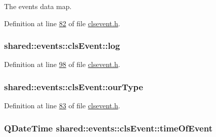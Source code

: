 The events data map. 



Definition at line \hyperlink{clsevent_8h_source_l00082}{82} of file \hyperlink{clsevent_8h_source}{clsevent.\-h}.

\hypertarget{classshared_1_1events_1_1cls_event_ac7f241779485316bf8a6016ee35d21db}{
\subsubsection[{log}]{ shared\-::events\-::cls\-Event\-::log\hspace{0.3cm}{\ttfamily [protected]}}}\label{db/d8b/classshared_1_1events_1_1cls_event_ac7f241779485316bf8a6016ee35d21db}


Definition at line \hyperlink{clsevent_8h_source_l00098}{98} of file \hyperlink{clsevent_8h_source}{clsevent.\-h}.

\hypertarget{classshared_1_1events_1_1cls_event_a3d8dd58c9e974ab19c2de66b300c4c79}{
\subsubsection[{our\-Type}]{ shared\-::events\-::cls\-Event\-::our\-Type\hspace{0.3cm}{\ttfamily [protected]}}}\label{db/d8b/classshared_1_1events_1_1cls_event_a3d8dd58c9e974ab19c2de66b300c4c79}


Definition at line \hyperlink{clsevent_8h_source_l00083}{83} of file \hyperlink{clsevent_8h_source}{clsevent.\-h}.

\hypertarget{classshared_1_1events_1_1cls_event_aecf9544cf664b22d6419275f1ad6bd9d}{
\subsubsection[{time\-Of\-Event}]{\setlength{\rightskip}{0pt plus 5cm}Q\-Date\-Time shared\-::events\-::cls\-Event\-::time\-Of\-Event\hspace{0.3cm}{\ttfamily [protected]}}}\label{db/d8b/classshared_1_1events_1_1cls_event_aecf9544cf664b22d6419275f1ad6bd9d}


